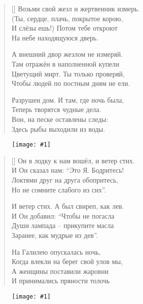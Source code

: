 \documentclass[12pt,a5paper,twoside]{article}
\newcommand{\pict}[1]{\thispagestyle{empty}\begin{figure}[H]\begin{center}\texttt{[image: \#1]}\end{center}\end{figure}\newpage}
\begin{document}
		
\settowidth{\versewidth}{Возьми свой жезл и жертвенник измерь.}
\begin{verse}[\versewidth]
Возьми свой жезл и жертвенник измерь.\\
(Ты, сердце, плачь, покрытое корою,\\
И слёзы ешь!) Потом тебе откроют\\
На небе находящуюся дверь.

А внешний двор жезлом не измеряй.\\
Там отражён в наполненной купели\\
Цветущий мирт. Ты только проверяй,\\
Чтобы людей по постным дням не ели.

Разрушен дом. И там, где ночь была,\\
Теперь творятся чудные дела.\\
Вон, на песке оставлены следы:\\
Здесь рыбы выходили из воды.
\end{verse}
\newpage

\pict{picts/On_v_lodku_k_nam} 

		
\settowidth{\versewidth}{Он в лодку к нам вошёл, и ветер стих.}
\begin{verse}[\versewidth]
Он в лодку к нам вошёл, и ветер стих.\\
И Он сказал нам: “Это Я. Бодритесь!\\
Локтями друг на друга обопритесь,\\
Но не сомните слабого из сих”.

И ветер стих. А был свиреп, как лев.\\
И Он добавил: “Чтобы не погасла\\
Души лампада – прикупите масла\\
Заранее, как мудрые из дев”.

На Галилею опускалась ночь,\\
Когда влекли на берег свой улов мы,\\
А женщины поставили жаровни\\
И принимались пряности толочь
\end{verse}
\newpage

\pict{picts/Ya_pshenoy_kashey} 
\end{document}
